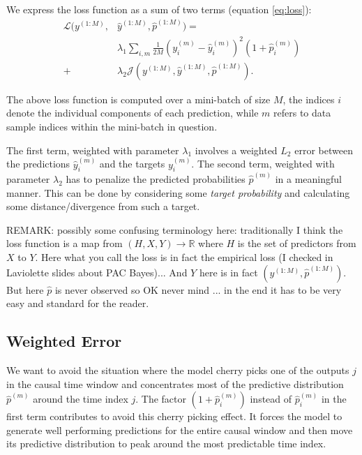 \documentclass[twoside]{article}
\begin{document}
We express the loss function as a sum of two terms (equation \ref{eq:loss}):
\begin{equation}\label{eq:loss}
\begin{aligned}
\mathcal{L}(y^{(1:M)}, &\hat{y}^{(1:M)}, \hat{p}^{(1:M)}) =\\ 
&\lambda_1 \sum_{i,m}{\frac{1}{2M} (y^{(m)}_{i} - \hat{y}^{(m)}_{i})^2 (1 + \hat{p}^{(m)}_i)} \\ 
+ &\lambda_2 \mathcal{J}(y^{(1:M)}, \hat{y}^{(1:M)}, \hat{p}^{(1:M)}).
\end{aligned}
\end{equation}

The above loss function is computed over a mini-batch of size $M$, the indices $i$ denote the
individual components of each prediction, while $m$ refers to data sample indices within the
mini-batch in question.

The first term, weighted with parameter $\lambda_1$ involves a weighted $L_2$ 
error between the predictions $\hat{y}^{(m)}_{i}$ and the targets $y^{(m)}_{i}$. The second term, weighted with parameter $\lambda_2$
has to penalize the predicted probabilities $\hat{p}^{(m)}$ in a meaningful manner. This can be done by considering some \emph{target probability} and
calculating some distance/divergence from such a target.

REMARK: possibly some confusing terminology here: traditionally I think the loss function is a map from $(H,X,Y)\to\mathbb{R}$ where $H$ is the set of predictors from $X$ to $Y$. Here what you call the loss is in fact the empirical loss (I checked in Laviolette slides about PAC Bayes)... And $Y$ here is in fact $(y^{(1:M)},\hat p^{(1:M)})$. But here  $\hat p$ is never observed  
so OK never mind ... in the end it has to be  very easy and standard for the reader.  


\subsection{Weighted Error}

We want to avoid the situation where the model cherry picks one of the outputs $j$ in the causal time window
and concentrates most of the predictive distribution $\hat p^{(m)}$ around the time index $j$. 
The factor $(1+\hat p_i^{(m)})$ instead of $\hat p_i^{(m)}$ in the first term contributes 
to avoid this cherry picking effect. It forces the model to generate well performing
predictions for the entire causal window and then move its predictive distribution
to peak around the most predictable time index.
\end{document}
